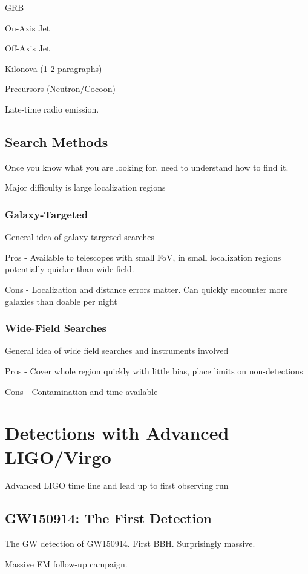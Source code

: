 GRB

On-Axis Jet

Off-Axis Jet

Kilonova (1-2 paragraphs)

Precursors (Neutron/Cocoon)

Late-time radio emission.

\subsection{Search Methods}
\label{sec:intro_searchmethods}
Once you know what you are looking for, need to understand how to find it. 

Major difficulty is large localization regions 

\subsubsection{Galaxy-Targeted}
\label{sec:intro_galaxy}
General idea of galaxy targeted searches

Pros - Available to telescopes with small FoV, in small localization regions potentially quicker than wide-field.

Cons - Localization and distance errors matter. Can quickly encounter more galaxies than doable per night

\subsubsection{Wide-Field Searches}
\label{sec:intro_widefield}
General idea of wide field searches and instruments involved

Pros - Cover whole region quickly with little bias, place limits on non-detections

Cons - Contamination and time available

\section{Detections with Advanced LIGO/Virgo}
\label{sec:intro_history}
Advanced LIGO time line and lead up to first observing run 

\subsection{GW150914: The First Detection}
\label{sec:intro_gw150914}
The GW detection of GW150914. First BBH. Surprisingly massive.

Massive EM follow-up campaign.

